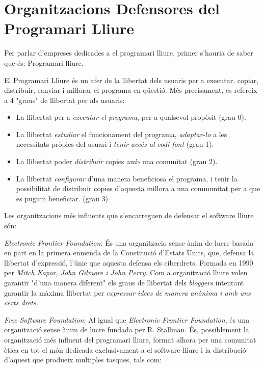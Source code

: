 \section{Organitzacions Defensores del Programari Lliure}

Per parlar d'empreses dedicades a el programari lliure, primer s'hauria de saber que és: Programari lliure.

El Programari Lliure és un afer de la llibertat dels usuaris per a executar, copiar, 		distribuir, canviar i millorar el programa en qüestió. Més precisament, es refereix a 4 "graus" de 		llibertat per als usuaris:

	\begin{itemize}
		\item La llibertat per a \textit{executar el programa}, per a qualsevol propòsit (grau  0).
		\item La llibertat \textit{estudiar} el funcionament del programa, \textit{adaptar-lo} a les 			necessitats pròpies del usuari i \textit{tenir accés al codi font} (grau 1).
		\item La llibertat poder \textit{distribuir} copies amb una comunitat (grau 2).
		\item La llibertat \textit{configurar} d'una manera beneficiosa el programa, i tenir la 		possibilitat de	distribuir copies d'aquesta millora a una communitat per a que es puguin 			beneficiar. (grau 3)
	\end{itemize}
Les organitzacions més influents que s'encarreguen de defensar el software lliure són:
 
\emph{Electronic Frontier Foundation}: És una organitzacio sense ànim de lucre basada en part en la primera enmenda de la Constitució d'Estats Units, que, defensa la llibertat d'expressió, l'únic que aquesta defensa els ciberdrets. Formada en 1990 per \textit{Mitch Kapor, John Gilmore i John Perry}. Com a organització lliure volen garantir "d'una manera diferent" els graus de llibertat dels \emph{bloggers} intentant garantir la màxima llibertat per \textit{expressar idees de manera anònima i amb uns certs drets.} \cite{OrgDefEFF}
	
\emph{Free Software Foundation}: Al igual que \emph{Electronic Frontier Foundation}, és una 		organització sense ànim de lucre fundada per R. Stallman. És, possiblement la organització més 		influent del programari lliure, format alhora per una comunitat ètica en tot el món dedicada 		exclusivament a el software lliure i la distribució d'aquest que produeix multiples tasques, tals com:

